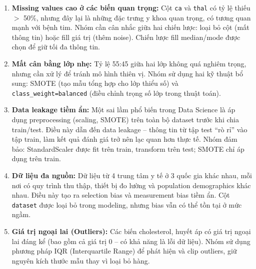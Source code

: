 \begin{enumerate}
    \item \textbf{Missing values cao ở các biến quan trọng:} Cột \texttt{ca} và \texttt{thal} có tỷ lệ thiếu $>$ 50\%, nhưng đây lại là những đặc trưng y khoa quan trọng, có tương quan mạnh với bệnh tim. Nhóm cần cân nhắc giữa hai chiến lược: loại bỏ cột (mất thông tin) hoặc fill giá trị (thêm noise). Chiến lược fill median/mode được chọn để giữ tối đa thông tin.
    
    \item \textbf{Mất cân bằng lớp nhẹ:} Tỷ lệ 55:45 giữa hai lớp không quá nghiêm trọng, nhưng cần xử lý để tránh mô hình thiên vị. Nhóm sử dụng hai kỹ thuật bổ sung: SMOTE (tạo mẫu tổng hợp cho lớp thiểu số) và \texttt{class\_weight=balanced} (điều chỉnh trọng số lớp trong thuật toán).
    
    \item \textbf{Data leakage tiềm ẩn:} Một sai lầm phổ biến trong Data Science là áp dụng preprocessing (scaling, SMOTE) trên toàn bộ dataset trước khi chia train/test. Điều này dẫn đến data leakage -- thông tin từ tập test ``rò rỉ'' vào tập train, làm kết quả đánh giá trở nên lạc quan hơn thực tế. Nhóm đảm bảo: StandardScaler được fit trên train, transform trên test; SMOTE chỉ áp dụng trên train.
    
    \item \textbf{Dữ liệu đa nguồn:} Dữ liệu từ 4 trung tâm y tế ở 3 quốc gia khác nhau, mỗi nơi có quy trình thu thập, thiết bị đo lường và population demographics khác nhau. Điều này tạo ra selection bias và measurement bias tiềm ẩn. Cột \texttt{dataset} được loại bỏ trong modeling, nhưng bias vẫn có thể tồn tại ở mức ngầm.
    
    \item \textbf{Giá trị ngoại lai (Outliers):} Các biến cholesterol, huyết áp có giá trị ngoại lai đáng kể (bao gồm cả giá trị 0 -- có khả năng là lỗi dữ liệu). Nhóm sử dụng phương pháp IQR (Interquartile Range) để phát hiện và clip outliers, giữ nguyên kích thước mẫu thay vì loại bỏ hàng.
\end{enumerate}
